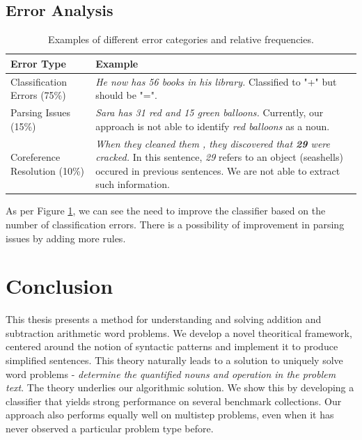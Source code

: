 \documentclass[11pt]{article}
\begin{document}
\subsection{Error Analysis}\label{sec:erroranalysis}
\begin{table}[h!]
\begin{center}
\begin{tabular}{|>{\centering\arraybackslash}m{8em}|>{\centering\arraybackslash}m{20em}|}
\hline
\bf Error Type & \bf Example \\
\hline
Classification Errors (75\%) & \textit{He now has 56 books in his library.} \newline Classified to "+" but should be "=". \\
\hline
Parsing Issues (15\%) & \textit{Sara has 31 red and 15 green balloons.} \newline Currently, our approach is not able to identify \textit{red balloons} as a noun.\\
\hline
Coreference Resolution (10\%) & \textit{When they cleaned them , they discovered that \textbf{29} were cracked.} \newline In this sentence, \textit{29} refers to an object (seashells) occured in previous sentences. We are not able to extract such information.\\
\hline
\end{tabular}
\caption{Examples of different error categories and relative frequencies.}
\label{figure:25}
\end{center}
\end{table}

As per Figure \ref{figure:25}, we can see the need to improve the classifier based on the number of classification errors. There is a possibility of improvement in parsing issues by adding more rules. 

\section{Conclusion}\label{sec:conclusion}
This thesis presents a method for understanding and solving addition and subtraction arithmetic word problems. We develop a novel theoritical framework, centered around the notion of syntactic patterns and implement it to produce simplified sentences. This theory naturally leads to a solution to uniquely solve word problems - \textit{determine the quantified nouns and operation in the problem text}. The theory underlies our algorithmic solution. We show this by developing a classifier that yields strong performance on several benchmark collections. Our approach also performs equally well on multistep problems, even when it has never observed a particular problem type before.
\end{document}
